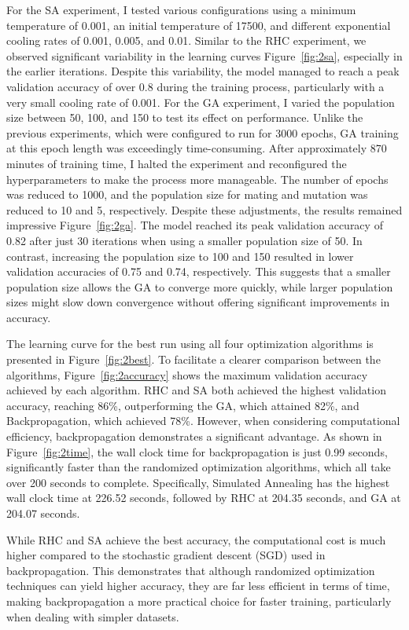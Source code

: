 For the SA experiment, I tested various configurations using a minimum temperature of 0.001, an initial temperature of 17500, and different exponential cooling rates of 0.001, 0.005, and 0.01. Similar to the RHC experiment, we observed significant variability in the learning curves Figure~\ref{fig:2sa}, especially in the earlier iterations. Despite this variability, the model managed to reach a peak validation accuracy of over 0.8 during the training process, particularly with a very small cooling rate of 0.001. For the GA experiment, I varied the population size between 50, 100, and 150 to test its effect on performance. Unlike the previous experiments, which were configured to run for 3000 epochs, GA training at this epoch length was exceedingly time-consuming. After approximately 870 minutes of training time, I halted the experiment and reconfigured the hyperparameters to make the process more manageable. The number of epochs was reduced to 1000, and the population size for mating and mutation was reduced to 10 and 5, respectively. Despite these adjustments, the results remained impressive Figure~\ref{fig:2ga}. The model reached its peak validation accuracy of 0.82 after just 30 iterations when using a smaller population size of 50. In contrast, increasing the population size to 100 and 150 resulted in lower validation accuracies of 0.75 and 0.74, respectively. This suggests that a smaller population size allows the GA to converge more quickly, while larger population sizes might slow down convergence without offering significant improvements in accuracy.

The learning curve for the best run using all four optimization algorithms is presented in Figure~\ref{fig:2best}. To facilitate a clearer comparison between the algorithms, Figure~\ref{fig:2accuracy} shows the maximum validation accuracy achieved by each algorithm. RHC and SA both achieved the highest validation accuracy, reaching 86\%, outperforming the GA, which attained 82\%, and Backpropagation, which achieved 78\%. However, when considering computational efficiency, backpropagation demonstrates a significant advantage. As shown in Figure~\ref{fig:2time}, the wall clock time for backpropagation is just 0.99 seconds, significantly faster than the randomized optimization algorithms, which all take over 200 seconds to complete. Specifically, Simulated Annealing has the highest wall clock time at 226.52 seconds, followed by RHC at 204.35 seconds, and GA at 204.07 seconds.

While RHC and SA achieve the best accuracy, the computational cost is much higher compared to the stochastic gradient descent (SGD) used in backpropagation. This demonstrates that although randomized optimization techniques can yield higher accuracy, they are far less efficient in terms of time, making backpropagation a more practical choice for faster training, particularly when dealing with simpler datasets.

